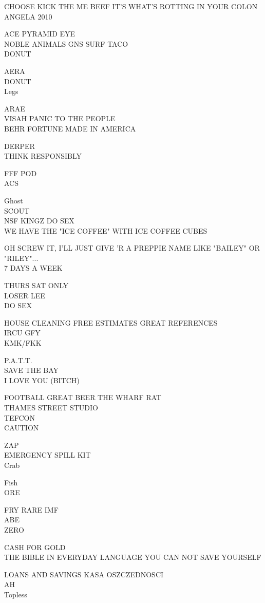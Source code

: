 \documentclass[10pt,letterpaper]{article}
\begin{document}
CHOOSE KICK THE ME BEEF IT'S WHAT'S ROTTING IN YOUR COLON\\
ANGELA 2010

ACE PYRAMID EYE\\
NOBLE ANIMALS GNS SURF TACO\\
DONUT

AERA\\
DONUT\\
Legs

ARAE\\
VISAH PANIC TO THE PEOPLE\\
BEHR FORTUNE MADE IN AMERICA

DERPER\\
THINK RESPONSIBLY

FFF POD\\
ACS

Ghost\\
SCOUT\\
NSF KINGZ DO SEX\\
WE HAVE THE "ICE COFFEE" WITH ICE COFFEE CUBES

OH SCREW IT, I'LL JUST GIVE 'R A PREPPIE NAME LIKE "BAILEY" OR "RILEY"...\\
7 DAYS A WEEK

THURS SAT ONLY\\
LOSER LEE\\
DO SEX

HOUSE CLEANING FREE ESTIMATES GREAT REFERENCES\\
IRCU GFY\\
KMK/FKK

P.A.T.T.\\
SAVE THE BAY\\
I LOVE YOU (BITCH)

FOOTBALL GREAT BEER THE WHARF RAT\\
THAMES STREET STUDIO\\
TEFCON\\
CAUTION

ZAP\\
EMERGENCY SPILL KIT\\
Crab

Fish\\
ORE

FRY RARE IMF\\
ABE\\
ZERO

CASH FOR GOLD\\
THE BIBLE IN EVERYDAY LANGUAGE YOU CAN NOT SAVE YOURSELF

LOANS AND SAVINGS KASA OSZCZEDNOSCI\\
AH\\
Topless
\end{document}
